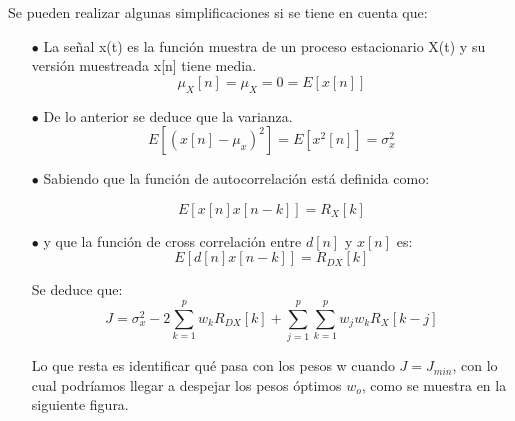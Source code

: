 Se pueden realizar algunas simplificaciones si se tiene en cuenta que: \\

\begin{itemize}
	\item [$\bullet$] La señal x(t) es la función muestra de un proceso estacionario X(t) y su versión muestreada x[n] tiene media. \\
	
	\begin{equation} \label{capcuatro_cuarentayuno}
		\mu_{X}[n] = \mu_{X}= 0= E[x[n]]
	\end{equation} 
\item [$\bullet$] De lo anterior se deduce que la varianza. \\

	\begin{equation} \label{capcuatro_cuarentaydos}
	E[(x[n]- \mu_{x})^{2}] = E[x^{2}[n]] = \sigma_{x}^{2} 
	\end{equation} 	
	
\item [$\bullet$] Sabiendo que la función de autocorrelación está definida como: 

	\begin{equation} \label{capcuatro_cuarentaytres}
	 E[x[n]x[n-k]]=R_X[k]
	\end{equation} 
\item [$\bullet$] y que la función de cross correlación entre $d[n]$ y $x[n]$ es: \\

	\begin{equation} \label{capcuatro_cuarentaycuatro}
	 E[d[n]x[n-k]]=R_{DX}[k]
\end{equation} 

Se deduce que: \\

\begin{equation} \label{capcuatro_cuarentaycinco}
	 J= \sigma_{x}^{2}-2 \sum_{k=1}^{p} w_{k} R_{DX}[k]+\sum_{j=1}^{p} \sum_{k=1}^{p} w_{j} w_{k}R_{X}[k-j]
\end{equation}

Lo que resta es identificar qué pasa con los pesos w cuando $J=J_{min}$, con lo cual podríamos llegar a despejar los pesos óptimos $w_{o}$, como se muestra en la siguiente figura. \\



\end{itemize}
